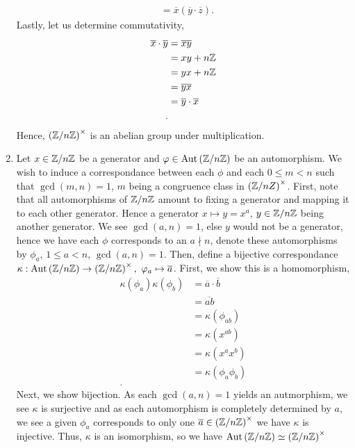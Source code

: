 \documentclass[a4paper]{article}
\begin{document}
\begin{solution}
\begin{enumerate}
\begin{align*}
				&= \overline{x}\left( \overline{y} \cdot \overline{z} \right)
			.\end{align*}
			Lastly, let us determine commutativity,
			\begin{align*}
				\overline{x} \cdot \overline{y} &= \overline{xy}  \\
				&= xy + n\mathbb{Z} \\
				&= yx + n\mathbb{Z} \\
&= \overline{yx} \\
&= \overline{y} \cdot \overline{x} \\
			.\end{align*}
			Hence, \(\left( \mathbb{Z} /  n \mathbb{Z} \right) ^{ \times}\) is an abelian group under multiplication.
		\item Let \(x \in \mathbb{Z} / n\mathbb{Z}\) be a generator and \(\varphi \in \operatorname{Aut}\left( \mathbb{Z} / n\mathbb{Z} \right) \) be an automorphism. We wish to induce a correspondance between each \(\phi\) and each \(0 \le m < n\) such that \(\gcd\left( m, n \right)  = 1\), \(m\) being a congruence class in \(\left( \mathbb{Z} / nZ \right) ^{\times}\). First, note that all automorphisms of \(\mathbb{Z} / n\mathbb{Z}\) amount to fixing a generator and mapping it to each other generator. Hence a generator \(x \mapsto y = x^{a}\), \(y \in \mathbb{Z} / n\mathbb{Z}\) being another generator. We see \(\gcd\left( a, n \right)  = 1\), else \(y\) would not be a generator, hence we have each \(\phi\) corresponds to an \(a \nmid n\), denote these automorphisms by \(\phi_{a}\), \(1 \le a < n\), \(\gcd\left( a, n \right)  = 1\). Then, define a bijective correspondance \(\kappa : \operatorname{Aut}\left( \mathbb{Z} / n\mathbb{Z} \right)  \to \left( \mathbb{Z} / n\mathbb{Z} \right) ^{\times}, \ \varphi_{a} \mapsto \overline{a}\). First, we show this is a homomorphism,
			\begin{align*}
				\kappa\left( \phi_{a} \right) \kappa\left( \phi_{b} \right)  &= \overline{a} \cdot \overline{b}\\
				&= \overline{ab} \\
				&= \kappa\left( \phi_{ab} \right)  \\
				&= \kappa\left( x^{ab} \right)  \\
				&= \kappa\left( x^{a}x^{b} \right)  \\
				&= \kappa\left( \phi_{a}\phi_{b} \right)  \\
			.\end{align*}Next, we show bijection. As each \(\gcd\left( a, n \right) = 1\) yields an autmorphism, we see \(\kappa\) is surjective and as each automorphism is completely determined by \(a\), we see a given \(\phi_{a}\) corresponds to only one \(\overline{a} \in \left( \mathbb{Z} / n\mathbb{Z} \right) ^{\times}\) we have \(\kappa\) is injective. Thus, \(\kappa\) is an isomorphism, so we have \(\operatorname{Aut}\left( \mathbb{Z} / n\mathbb{Z} \right) \simeq \left( \mathbb{Z} / n\mathbb{Z} \right) ^{\times}\)
\end{enumerate}
\end{solution}
\end{document}
